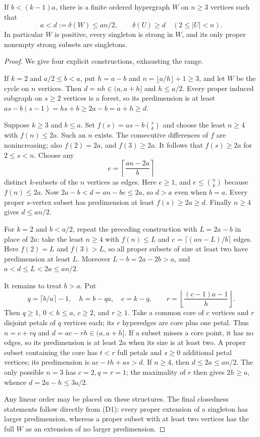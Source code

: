 \begin{lemma}
\label{D:atom}
If $b<(k-1)a$, there is a finite ordered hypergraph $W$ on $n\geq3$
vertices such that
\[
 a<d:=\delta(W)\leq an/2,
 \qquad \delta(U)\geq d\quad(2\leq |U|<n).
 \tag{D1}\label{eq:D-atom}
\]
In particular $W$ is positive, every singleton is strong in $W$, and
its only proper nonempty strong subsets are singletons.
\end{lemma}
\begin{proof}
We give four explicit constructions, exhausting the range.

If $k=2$ and $a/2\leq b<a$, put $h=a-b$ and
$n=\lfloor a/h\rfloor+1\geq3$, and let $W$ be the cycle on
$n$ vertices. Then $d=nh\in(a,a+h]$ and $h\leq a/2$.
Every proper induced subgraph on $s\geq2$ vertices is a forest,
so its predimension is at least
$as-b(s-1)=hs+b\geq2a-b=a+h\geq d$.

Suppose $k\geq3$ and $b\leq a$. Set
$f(s)=as-b\binom{s}{k}$ and choose the least $n\geq4$ with
$f(n)\leq2a$. Such an $n$ exists. The consecutive differences of
$f$ are nonincreasing; also $f(2)=2a$, and $f(3)\geq2a$.
It follows that $f(s)\geq2a$ for $2\leq s<n$.
Choose any
\[
                      e=\left\lceil\frac{an-2a}{b}\right\rceil
\]
distinct $k$-subsets of the $n$ vertices as edges. Here $e\geq1$,
and $e\leq\binom nk$ because $f(n)\leq2a$. Now
$2a-b<d=an-be\leq2a$, so $d>a$ even when $b=a$.
Every proper $s$-vertex subset has predimension at least
$f(s)\geq2a\geq d$. Finally $n\geq4$ gives $d\leq an/2$.

For $k=2$ and $b<a/2$, repeat the preceding construction with
$L=2a-b$ in place of $2a$: take the least $n\geq4$ with
$f(n)\leq L$ and $e=\lceil(an-L)/b\rceil$ edges.
Here $f(2)=L$ and $f(3)>L$, so all proper subsets of size at least
two have predimension at least $L$. Moreover
$L-b=2a-2b>a$, and $a<d\leq L<2a\leq an/2$.

It remains to treat $b>a$. Put
\[
 q=\lceil b/a\rceil-1,\quad h=b-qa,\quad c=k-q,
 \qquad
 r=\left\lfloor\frac{(c-1)a-1}{h}\right\rfloor.
\]
Then $q\geq1$, $0<h\leq a$, $c\geq2$, and $r\geq1$.
Take a common core of $c$ vertices and $r$ disjoint petals of
$q$ vertices each; its $r$ hyperedges are core plus one petal.
Thus $n=c+rq$ and $d=ac-rh\in(a,a+h]$.
If a subset misses a core point, it has no edges, so its
predimension is at least $2a$ when its size is at least two.
A proper subset containing the core has $t<r$ full petals and
$s\geq0$ additional petal vertices; its predimension is
$ac-th+as>d$. If $n\geq4$, then $d\leq2a\leq an/2$.
The only possible $n=3$ has $c=2,q=r=1$; the maximality of $r$
then gives $2h\geq a$, whence $d=2a-h\leq3a/2$.

Any linear order may be placed on these structures. The final
closedness statements follow directly from (D1): every proper
extension of a singleton has larger predimension, whereas a proper
subset with at least two vertices has the full $W$ as an extension
of no larger predimension.
\end{proof}

